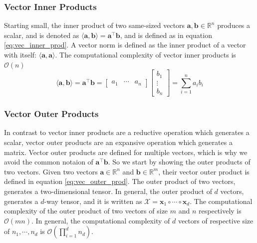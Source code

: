     \subsubsection{Vector Inner Products} \label{sec:Vector Inner Products}
        Starting small, the inner product of two same-sized vectors $\mathbf{a,
        b} \in \mathbb{R}^n$ produces a scalar, and is denoted as $\langle
        \mathbf{a, b}\rangle = \mathbf{a}^\intercal \mathbf{b}$, and is defined
        as in equation \ref{eq:vec_inner_prod}. A vector norm is defined as the
        inner product of a vector with itself: $\langle \mathbf{a, a} \rangle$.
        The computational complexity of vector inner products is
        $\mathcal{O}(n)$
        \begin{equation} \label{eq:vec_inner_prod}
            \langle \mathbf{a, b} \rangle = \mathbf{a}^\intercal \mathbf{b} = 
            \left[
                \begin{array}{ccc}
                    a_1 & \cdots & a_n
                \end{array} 
            \right]
            \left[
                \begin{array}{c}
                    b_1 \\
                    \vdots \\
                    b_n
                \end{array} 
            \right]
            =
            \sum_{i = 1}^{n} a_ib_i
        \end{equation}
    

    \subsubsection{Vector Outer Products} \label{sec:Vector Outer Products}
        In contrast to vector inner products are a reductive operation which
        generates a scalar, vector outer products are an expansive operation
        which generates a matrix. Vector outer products are defined for multiple
        vectors, which is why we avoid the common notaion of
        $\mathbf{a}^\intercal\mathbf{b}$. So we start by showing the outer
        products of two vectors. Given two vectors $\mathbf{a}\in \mathbb{R}^n$
        and $\mathbf{b}\in \mathbb{R}^m$, their vector outer product is defined
        in equation \ref{eq:vec_outer_prod}. The outer product of two vectors,
        generates a two-dimensional tensor. In general, the outer product of $d$
        vectors, generates a $d$-way tensor, and it is written as $\mathcal{X} =
        \mathbf{x}_1 \circ \cdots \circ \mathbf{x}_d$. The computational
        complexity of the outer product of two vectors of size $m$ and $n$
        respectively is $\mathcal{O}(mn)$. In general, the computational
        complexity of $d$ vectors of respective size of $n_1, \cdots, n_d$ is
        $\mathcal{O}(\prod_{i=1}^{d} n_d)$.

